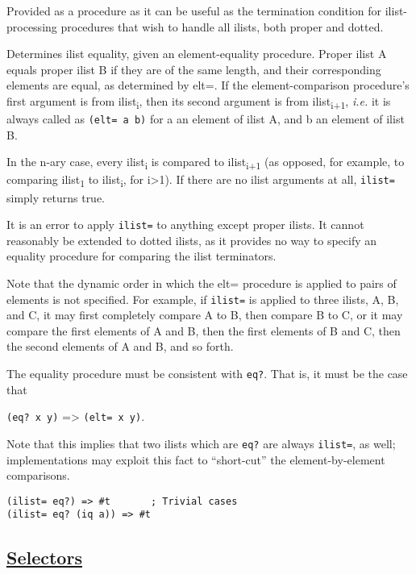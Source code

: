 \begin{description}
Provided as a procedure as it can be useful as the termination condition
for ilist-processing procedures that wish to handle all ilists, both
proper and dotted.
\item[ \href{}{} \texttt{ilist=} elt= ilist\textsubscript{1} \ldots{}
-\textgreater{} boolean ]
Determines ilist equality, given an element-equality procedure. Proper
ilist A equals proper ilist B if they are of the same length, and their
corresponding elements are equal, as determined by elt=. If the
element-comparison procedure's first argument is from
ilist\textsubscript{i}, then its second argument is from
ilist\textsubscript{i+1}, \emph{i.e.} it is always called as
\texttt{(elt=\ a\ b)} for a an element of ilist A, and b an element of
ilist B.

In the n-ary case, every ilist\textsubscript{i} is compared to
ilist\textsubscript{i+1} (as opposed, for example, to comparing
ilist\textsubscript{1} to ilist\textsubscript{i}, for i\textgreater{}1).
If there are no ilist arguments at all, \texttt{ilist=} simply returns
true.

It is an error to apply \texttt{ilist=} to anything except proper
ilists. It cannot reasonably be extended to dotted ilists, as it
provides no way to specify an equality procedure for comparing the ilist
terminators.

Note that the dynamic order in which the elt= procedure is applied to
pairs of elements is not specified. For example, if \texttt{ilist=} is
applied to three ilists, A, B, and C, it may first completely compare A
to B, then compare B to C, or it may compare the first elements of A and
B, then the first elements of B and C, then the second elements of A and
B, and so forth.

The equality procedure must be consistent with \texttt{eq?}. That is, it
must be the case that

\texttt{(eq?\ x\ y)} =\textgreater{} \texttt{(elt=\ x\ y)}.

Note that this implies that two ilists which are \texttt{eq?} are always
\texttt{ilist=}, as well; implementations may exploit this fact to
``short-cut'' the element-by-element comparisons.

\begin{verbatim}
(ilist= eq?) => #t       ; Trivial cases
(ilist= eq? (iq a)) => #t
\end{verbatim}
\end{description}

\subsection{\texorpdfstring{\href{}{Selectors}}{Selectors}}\label{selectors}

